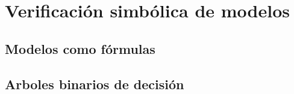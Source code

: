 \chapter{Verificación simbólica de modelos}

\section{Modelos como fórmulas}
\section{Arboles binarios de decisión}


